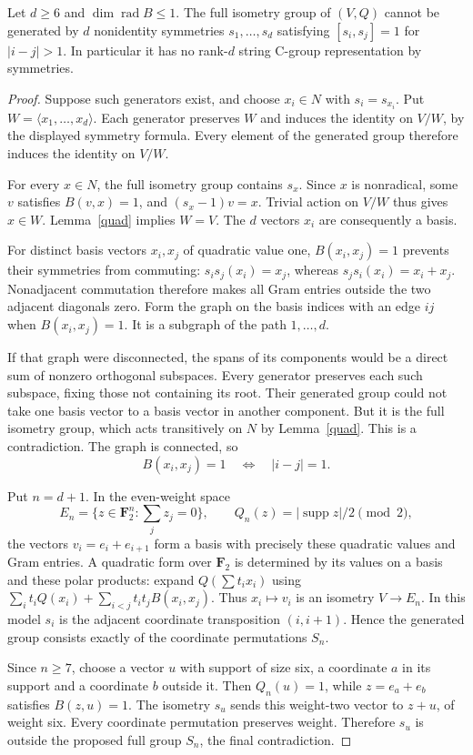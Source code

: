 \documentclass[11pt,a4paper]{article}
\newcommand{\gen}[1]{\langle#1\rangle}
\begin{document}
\begin{theorem}\label{no}
Let $d\geq6$ and $\dim\operatorname{rad}B\leq1$.
The full isometry group of $(V,Q)$ cannot be generated by $d$
nonidentity symmetries $s_1,\ldots,s_d$ satisfying
$[s_i,s_j]=1$ for $|i-j|>1$. In particular it has no rank-$d$
string C-group representation by symmetries.
\end{theorem}
\begin{proof}
Suppose such generators exist, and choose $x_i\in N$ with
$s_i=s_{x_i}$. Put $W=\gen{x_1,\ldots,x_d}$. Each generator
preserves $W$ and induces the identity on $V/W$, by the displayed
symmetry formula. Every element of the generated group therefore
induces the identity on $V/W$.

For every $x\in N$, the full isometry group contains $s_x$.
Since $x$ is nonradical, some $v$ satisfies $B(v,x)=1$, and
$(s_x-1)v=x$. Trivial action on $V/W$ thus gives $x\in W$.
Lemma~\ref{quad} implies $W=V$. The $d$ vectors $x_i$ are
consequently a basis.

For distinct basis vectors $x_i,x_j$ of quadratic value one,
$B(x_i,x_j)=1$ prevents their symmetries from commuting:
$s_i s_j(x_i)=x_j$, whereas $s_j s_i(x_i)=x_i+x_j$.
Nonadjacent commutation therefore makes all Gram entries outside
the two adjacent diagonals zero. Form the graph on the basis indices
with an edge $ij$ when $B(x_i,x_j)=1$. It is a subgraph of the
path $1,\ldots,d$.

If that graph were disconnected, the spans of its components would
be a direct sum of nonzero orthogonal subspaces. Every generator
preserves each such subspace, fixing those not containing its root.
Their generated group could not take one basis vector to a basis
vector in another component. But it is the full isometry group,
which acts transitively on $N$ by Lemma~\ref{quad}. This is a
contradiction. The graph is connected, so
\[
 B(x_i,x_j)=1\quad\Longleftrightarrow\quad |i-j|=1.
\]

Put $n=d+1$. In the even-weight space
\[
 E_n=\{z\in\mathbf F_2^n:\textstyle\sum_j z_j=0\},
 \qquad Q_n(z)=|\operatorname{supp}z|/2\pmod2,
\]
the vectors $v_i=e_i+e_{i+1}$ form a basis with precisely these
quadratic values and Gram entries. A quadratic form over $\mathbf F_2$
is determined by its values on a basis and these polar products:
expand $Q(\sum t_i x_i)$ using
$\sum_i t_iQ(x_i)+\sum_{i<j}t_it_jB(x_i,x_j)$.
Thus $x_i\mapsto v_i$ is an isometry $V\longrightarrow E_n$.
In this model $s_i$ is the adjacent coordinate transposition
$(i,i+1)$. Hence the generated group consists exactly of the
coordinate permutations $S_n$.

Since $n\geq7$, choose a vector $u$ with support of size six,
a coordinate $a$ in its support and a coordinate $b$ outside it.
Then $Q_n(u)=1$, while $z=e_a+e_b$ satisfies $B(z,u)=1$.
The isometry $s_u$ sends this weight-two vector to $z+u$, of
weight six. Every coordinate permutation preserves weight.
Therefore $s_u$ is outside the proposed full group $S_n$,
the final contradiction.
\end{proof}
\end{document}
